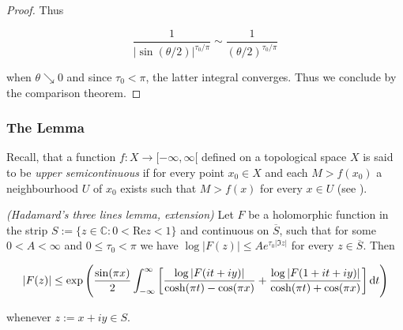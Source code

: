 \begin{proof}
	Thus 
	
	\begin{equation*}
		\frac{1}{\left| \sin(\theta/2) \right|^{\tau_0/\pi}} \sim\frac{1}{\left( \theta/2 \right)^{\tau_0/\pi}}
	\end{equation*}
	
	\noindent when $\theta \searrow 0$ and since $\tau_0 < \pi$, the latter integral converges. Thus we conclude by the comparison theorem.
\end{proof}

\subsubsection{The Lemma}
Recall, that a function $f: X \to [-\infty,\infty[$ defined on a topological space $X$ is said to be \emph{upper semicontinuous} if for every point $x_0 \in X$ and each $M > f\left( x_0 \right)$ a neighbourhood $U$ of $x_0$ exists such that $M > f\left( x \right)$ for every $x \in U$ (see \cite[199]{rao:complex_analysis:1991}).

\vspace{2mm}

\begin{mdframed}
	\begin{lemma}\emph{(Hadamard's three lines lemma, extension)}
		Let $F$ be a holomorphic function in the strip $S := \{z \in \mathbb{C}: 0 < \mathrm{Re}z < 1\}$ and continuous on $\overline{S}$, such that for some $0 < A < \infty$ and $0 \leq \tau_0 < \pi$ we have $\log \vert F\left( z \right)\vert \leq A e^{\tau_0 \vert \Im z \vert}$ for every $z \in \overline{S}$. Then

			\begin{equation*}
				\vert F(z) \vert \leq \exp\left( \frac{\sin(\pi x)}{2} \int_{-\infty}^\infty \left[ \frac{\log \vert F(it + iy)\vert}{\cosh(\pi t) - \cos(\pi x)} + \frac{\log \vert F(1 + it + iy)\vert}{\cosh(\pi t) + \cos(\pi x)} \right] \mathop{}\!\mathrm{d} t\right)
			\end{equation*}

			whenever $z := x + iy \in S$.
			\label{lem:EHTL}
	\end{lemma}
\end{mdframed}

